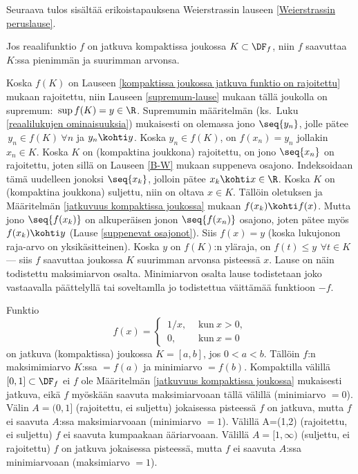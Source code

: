 Seuraava tulos sisältää erikoistapauksena Weierstrassin lauseen
\ref{Weierstrassin peruslause}.
\begin{*Lause} \label{weierstrass} Jos reaalifunktio $f$ on jatkuva kompaktissa joukossa
$K\subset\DF_f$, niin $f$ saavuttaa $K$:ssa pienimmän ja suurimman arvonsa. 
\end{*Lause}
\tod Koska $f(K)$ on Lauseen \ref{kompaktissa joukossa jatkuva funktio on rajoitettu} mukaan
rajoitettu, niin Lauseen \ref{supremum-lause} mukaan tällä joukolla on supremum:
$\,\sup f(K) = y\in\R$. Supremumin määritelmän (ks.\ Luku \ref{reaalilukujen ominaisuuksia})
mukaisesti on olemassa jono $\seq{y_n}$, jolle pätee $\,y_n \in f(K)\ \forall n$ ja
$y_n \kohti y$. Koska $y_n \in f(K)$, on $f(x_n) = y_n$ jollakin $x_n \in K$. Koska $K$ on
(kompaktina joukkona) rajoitettu, on jono $\seq{x_n}$ on rajoitettu, joten sillä on Lauseen
\ref{B-W} mukaan suppeneva osajono. Indeksoidaan tämä uudelleen jonoksi $\seq{x_k}$, jolloin
pätee $x_k \kohti x\in\R$. Koska $K$ on (kompaktina joukkona) suljettu, niin on oltava
$x \in K$. Tällöin oletuksen ja Määritelmän \ref{jatkuvuus kompaktissa joukossa} mukaan
$f(x_k) \kohti f(x)$. Mutta jono $\seq{f(x_k)}$ on alkuperäisen jonon $\seq{f(x_n)}$ osajono,
joten pätee myös $f(x_k) \kohti y$ (Lause \ref{suppenevat osajonot}). Siis $f(x)=y$ 
(koska lukujonon raja-arvo on yksikäsitteinen). Koska $y$ on $f(K)$:n yläraja, on 
$f(t) \le y\,\ \forall t \in K$ --- siis $f$ saavuttaa joukossa $K$ suurimman arvonsa
pisteessä $x$. Lause on näin todistettu maksimiarvon osalta. Minimiarvon osalta lause
todistetaan joko vastaavalla päättelyllä tai soveltamlla jo todistettua väittämää funktioon
$-f$. \loppu
\begin{Exa} Funktio 
\[ f(x)= \begin{cases} \,1/x,\,\ &\text{kun}\ x>0, \\ \,0, &\text{kun}\ x=0 
         \end{cases} \]on jatkuva (kompaktissa) joukossa $K=[a,b]$, jos $0<a<b$. Tällöin $f$:n maksimimiarvo $K$:ssa
$= f(a)$ ja minimiarvo $= f(b)$. Kompaktilla välillä $[0,1]\subset\DF_f$ ei $f$ ole 
Määritelmän \ref{jatkuvuus kompaktissa joukossa} mukaisesti jatkuva, eikä $f$ myöskään saavuta
maksimiarvoaan tällä välillä (minimiarvo $=0$). Välin $A=(0,1]$ (rajoitettu, ei suljettu)
jokaisessa pisteessä $f$ on jatkuva, mutta $f$ ei saavuta $A$:ssa maksimiarvoaan
(minimiarvo $=1$). Välillä A=(1,2) (rajoitettu, ei suljettu) $f$ ei saavuta kumpaakaan
ääriarvoaan. Välillä $A=[1,\infty)$ (suljettu, ei rajoitettu) $f$ on jatkuva jokaisessa
pisteessä, mutta $f$ ei saavuta $A$:ssa minimiarvoaan (maksimiarvo $=1$). \loppu
\end{Exa}

